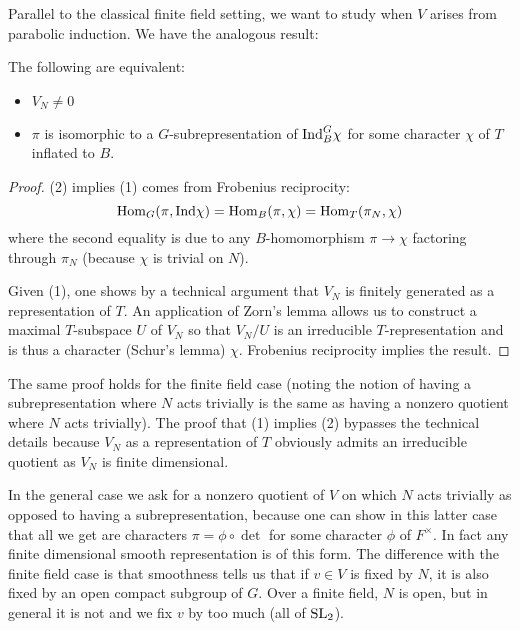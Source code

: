 Parallel to the classical finite field setting, we want to study when $V$ arises from parabolic induction. We have the analogous result:

\begin{prop}
    The following are equivalent:
    \begin{itemize}
        \item $V_N \neq 0$
        \item $\pi$ is isomorphic to a $G$-subrepresentation of $\mathrm{Ind}_B^G \chi$ for some character $\chi$ of $T$ inflated to $B$.
    \end{itemize}
\end{prop}
\begin{proof}
    (2) implies (1) comes from Frobenius reciprocity:
    $$\mathrm{Hom}_G(\pi,\mathrm{Ind} \chi) = \mathrm{Hom}_B(\pi, \chi) = \mathrm{Hom}_T(\pi_N,\chi)$$ where the second equality is due to any $B$-homomorphism $\pi \to \chi$ factoring through $\pi_N$ (because $\chi$ is trivial on $N$).

    Given (1), one shows by a technical argument that $V_N$ is finitely generated as a representation of $T$. An application of Zorn's lemma allows us to construct a maximal $T$-subspace $U$ of $V_N$ so that $V_N/U$ is an irreducible $T$-representation and is thus a character (Schur's lemma) $\chi$. Frobenius reciprocity implies the result.
\end{proof}
\begin{rem}
    The same proof holds for the finite field case (noting the notion of having a subrepresentation where $N$ acts trivially is the same as having a nonzero quotient where $N$ acts trivially). The proof that (1) implies (2) bypasses the technical details because $V_N$ as a representation of $T$ obviously admits an irreducible quotient as $V_N$ is finite dimensional.
\end{rem}
\begin{rem}
    In the general case we ask for a nonzero quotient of $V$ on which $N$ acts trivially as opposed to having a subrepresentation, because one can show in this latter case that all we get are characters $\pi = \phi \circ \det$ for some character $\phi$ of $F^\times$. In fact any finite dimensional smooth representation is of this form. The difference with the finite field case is that smoothness tells us that if $v\in V$ is fixed by $N$, it is also fixed by an open compact subgroup of $G$. Over a finite field, $N$ is open, but in general it is not and we fix $v$ by too much (all of $\mathrm{SL}_2$).
\end{rem}

